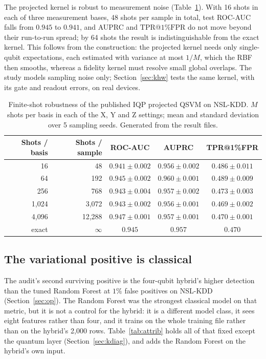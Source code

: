 \documentclass[preprint,11pt]{elsarticle}
\newcommand{\tpr}{\mathrm{TPR}}
\newcommand{\fpr}{\mathrm{FPR}}
\begin{document}
The projected kernel is robust to measurement noise (Table~\ref{tab:shots}). With 16 shots in each of three
measurement bases, 48 shots per sample in total, test ROC-AUC falls from $0.945$ to $0.941$, and AUPRC and
$\tpr$@$1\%\fpr$ do not move beyond their run-to-run spread; by 64 shots the result is indistinguishable
from the exact kernel. This follows from the construction: the projected kernel needs only single-qubit
expectations, each estimated with variance at most $1/M$, which the RBF then smooths, whereas a fidelity
kernel must resolve small global overlaps. The study models sampling noise only; Section~\ref{sec:khw}
tests the same kernel, with its gate and readout errors, on real devices.

\begin{table}[t]
\centering
\caption{Finite-shot robustness of the published IQP projected QSVM on NSL-KDD. $M$ shots per basis in
each of the X, Y and Z settings; mean and standard deviation over 5 sampling seeds. Generated from the
result files.}
\label{tab:shots}
\footnotesize
\renewcommand{\arraystretch}{1.15}
\setlength{\tabcolsep}{6pt}
\begin{tabular}{@{}rrccc@{}}
\toprule
\textbf{Shots / basis} & \textbf{Shots / sample} & \textbf{ROC-AUC} & \textbf{AUPRC} & \textbf{TPR@1\%FPR}\\
\midrule
16 & 48 & $0.941\pm0.002$ & $0.956\pm0.002$ & $0.486\pm0.011$\\
64 & 192 & $0.945\pm0.002$ & $0.960\pm0.001$ & $0.489\pm0.009$\\
256 & 768 & $0.943\pm0.004$ & $0.957\pm0.002$ & $0.473\pm0.003$\\
1{,}024 & 3{,}072 & $0.943\pm0.002$ & $0.956\pm0.001$ & $0.469\pm0.002$\\
4{,}096 & 12{,}288 & $0.947\pm0.001$ & $0.957\pm0.001$ & $0.470\pm0.001$\\
\addlinespace[2pt]
exact & $\infty$ & $0.945$ & $0.957$ & $0.470$\\
\bottomrule
\end{tabular}
\end{table}

\subsection{The variational positive is classical}\label{sec:kattr}
The audit's second surviving positive is the four-qubit hybrid's higher detection than the tuned Random
Forest at $1\%$ false positives on NSL-KDD (Section~\ref{sec:op}). The Random Forest was the strongest
classical model on that metric, but it is not a control for the hybrid: it is a different model class,
it sees eight features rather than four, and it trains on the whole training file rather than on the
hybrid's 2{,}000 rows. Table~\ref{tab:attrib} holds all of that fixed except the quantum layer
(Section~\ref{sec:kdiag}), and adds the Random Forest on the hybrid's own input.
\end{document}
